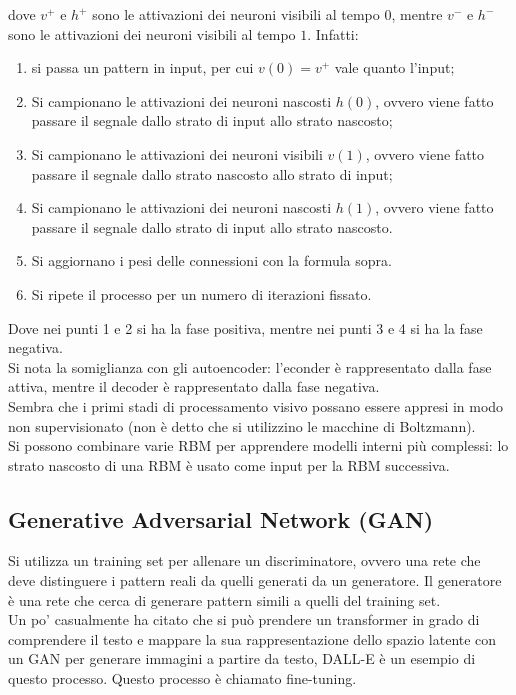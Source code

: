 dove $v^{+}$ e $h^{+}$ sono le attivazioni dei neuroni visibili al tempo $0$,
mentre $v^{-}$ e $h^{-}$ sono le attivazioni dei neuroni visibili al tempo
$1$. Infatti:
\begin{enumerate}
	\item si passa un pattern in input, per cui $v(0) = v^{+}$ vale quanto
		l'input; 

	\item Si campionano le attivazioni dei neuroni nascosti $h(0)$, ovvero viene
	fatto passare il segnale dallo strato di input allo strato nascosto;

	\item Si campionano le attivazioni dei neuroni visibili $v(1)$, ovvero viene
	fatto passare il segnale dallo strato nascosto allo strato di input;

	\item Si campionano le attivazioni dei neuroni nascosti $h(1)$, ovvero viene
	fatto passare il segnale dallo strato di input allo strato nascosto.

	\item Si aggiornano i pesi delle connessioni con la formula sopra.

	\item Si ripete il processo per un numero di iterazioni fissato.
\end{enumerate}

Dove nei punti 1 e 2 si ha la fase positiva, mentre nei punti 3 e 4 si ha la
fase negativa.\\
Si nota la somiglianza con gli autoencoder: l'econder è rappresentato dalla fase
attiva, mentre il decoder è rappresentato dalla fase negativa.\\
Sembra che i primi stadi di processamento visivo possano essere appresi in modo
non supervisionato (non è detto che si utilizzino le macchine di Boltzmann).\\
Si possono combinare varie RBM per apprendere modelli interni più complessi: lo
strato nascosto di una RBM è usato come input per la RBM successiva.

\subsection{Generative Adversarial Network (GAN)}

Si utilizza un training set per allenare un discriminatore, ovvero una rete che
deve distinguere i pattern reali da quelli generati da un generatore. Il
generatore è una rete che cerca di generare pattern simili a quelli del training
set. \\
Un po' casualmente ha citato che si può prendere un transformer in grado di
comprendere il testo e mappare la sua rappresentazione dello spazio latente con
un GAN per generare immagini a partire da testo, DALL-E è un esempio di questo
processo. Questo processo è chiamato fine-tuning.


